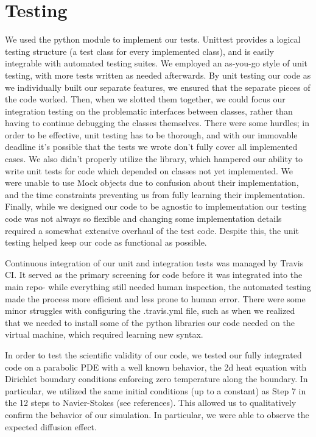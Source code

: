 \documentclass{article}
\begin{document}
	\section{Testing}
	We used the python  module to implement our tests. Unittest provides a logical testing structure (a test class for every implemented class), and is easily integrable with automated testing suites. We employed an as-you-go style of unit testing, with more tests written as needed afterwards. By unit testing our code as we individually built our separate features, we ensured that the separate pieces of the code worked. Then, when we slotted them together, we could focus our integration testing on the problematic interfaces between classes, rather than having to continue debugging the classes themselves. There were some hurdles; in order to be effective, unit testing has to be thorough, and with our immovable deadline it’s possible that the tests we wrote don’t fully cover all implemented cases. We also didn’t properly utilize the  library, which hampered our ability to write unit tests for code which depended on classes not yet implemented. We were unable to use Mock objects due to confusion about their implementation, and the time constraints preventing us from fully learning their implementation. Finally, while we designed our code to be agnostic to implementation our testing code was not always so flexible and changing some implementation details required a somewhat extensive overhaul of the test code. Despite this, the unit testing helped keep our code as functional as possible. 
	
	Continuous integration of our unit and integration tests was managed by Travis CI. It served as the primary screening for code before it was integrated into the main repo- while everything still needed human inspection, the automated testing made the process more efficient and less prone to human error. There were some minor struggles with configuring the .travis.yml file, such as when we realized that we needed to install some of the python libraries our code needed on the virtual machine, which required learning new syntax.
	
	In order to test the scientific validity of our code, we tested our fully integrated code on a parabolic PDE with a well known behavior, the 2d heat equation with Dirichlet boundary conditions enforcing zero temperature along the boundary. In particular, we utilized the same initial conditions (up to a constant)  as Step 7 in the 12 steps to Navier-Stokes (see references). This allowed us to qualitatively confirm the behavior of our simulation. In particular, we were able to observe the expected diffusion effect.
\end{document}
